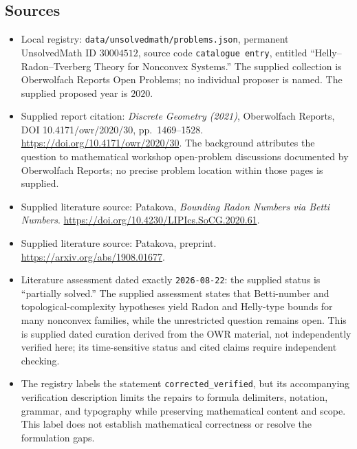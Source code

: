 \documentclass[11pt]{article}
\begin{document}
\subsection{Sources}
\begin{itemize}
\item Local registry: \texttt{data/unsolvedmath/problems.json}, permanent UnsolvedMath ID \(30004512\), source code \texttt{catalogue entry}, entitled ``Helly--Radon--Tverberg Theory for Nonconvex Systems.'' The supplied collection is Oberwolfach Reports Open Problems; no individual proposer is named. The supplied proposed year is \(2020\).
\item Supplied report citation: \emph{Discrete Geometry (2021)}, Oberwolfach Reports, DOI 10.4171/owr/2020/30, pp.\ 1469--1528. \url{https://doi.org/10.4171/owr/2020/30}. The background attributes the question to mathematical workshop open-problem discussions documented by Oberwolfach Reports; no precise problem location within those pages is supplied.
\item Supplied literature source: Patakova, \emph{Bounding Radon Numbers via Betti Numbers}. \url{https://doi.org/10.4230/LIPIcs.SoCG.2020.61}.
\item Supplied literature source: Patakova, preprint. \url{https://arxiv.org/abs/1908.01677}.
\item Literature assessment dated exactly \texttt{2026-08-22}: the supplied status is ``partially solved.'' The supplied assessment states that Betti-number and topological-complexity hypotheses yield Radon and Helly-type bounds for many nonconvex families, while the unrestricted question remains open. This is supplied dated curation derived from the OWR material, not independently verified here; its time-sensitive status and cited claims require independent checking.
\item The registry labels the statement \texttt{corrected\_verified}, but its accompanying verification description limits the repairs to formula delimiters, notation, grammar, and typography while preserving mathematical content and scope. This label does not establish mathematical correctness or resolve the formulation gaps.
\end{itemize}
\end{document}
